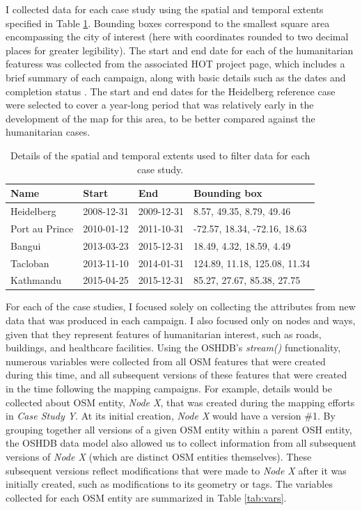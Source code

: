 I collected data for each case study using the spatial and temporal extents specified in Table \ref{tab:cases}. Bounding boxes correspond to the smallest square area encompassing the city of interest (here with coordinates rounded to two decimal places for greater legibility). The start and end date for each of the humanitarian featuress was collected from the associated HOT project page, which includes a brief summary of each campaign, along with basic details such as the dates and completion status \parencite{humanitarian_openstreetmap_team_projects_2020}. The start and end dates for the Heidelberg reference case were selected to cover a year-long period that was relatively early in the development of the map for this area, to be better compared against the humanitarian cases. 

\begin{table}
\centering
\caption{Details of the spatial and temporal extents used to filter data for each case study.}
\label{tab:cases}
\begin{tabular}{llll}
\toprule
Name                     & Start      & End        & Bounding box                 \\
\midrule
Heidelberg               & 2008-12-31 & 2009-12-31 & 8.57, 49.35, 8.79, 49.46     \\
Port au Prince         & 2010-01-12 & 2011-10-31 & -72.57, 18.34, -72.16, 18.63 \\
Bangui & 2013-03-23 & 2015-12-31 & 18.49, 4.32, 18.59, 4.49     \\
Tacloban           & 2013-11-10 & 2014-01-31 & 124.89, 11.18, 125.08, 11.34 \\
Kathmandu         & 2015-04-25 & 2015-12-31 & 85.27, 27.67, 85.38, 27.75  \\
\bottomrule
\end{tabular}
\end{table}

For each of the case studies, I focused solely on collecting the attributes from new data that was produced in each campaign. I also focused only on nodes and ways, given that they represent features of humanitarian interest, such as roads, buildings, and healthcare facilities. Using the OSHDB's \textit{stream()} functionality, numerous variables were collected from all OSM features that were created during this time, and all subsequent versions of these features that were created in the time following the mapping campaigns. For example, details would be collected about OSM entity, \textit{Node X}, that was created during the mapping efforts in \textit{Case Study Y}. At its initial creation, \textit{Node X} would have a version \#1. By grouping together all versions of a given OSM entity within a parent OSH entity, the OSHDB data model also allowed us to collect information from all subsequent versions of \textit{Node X} (which are distinct OSM entities themselves). These subsequent versions reflect modifications that were made to \textit{Node X} after it was initially created, such as modifications to its geometry or tags. The variables collected for each OSM entity are summarized in Table \ref{tab:vars}. 

